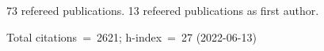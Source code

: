 73 refereed publications. 13 refeered publications as first author.

Total citations~=~2621; h-index~=~27 (2022-06-13)